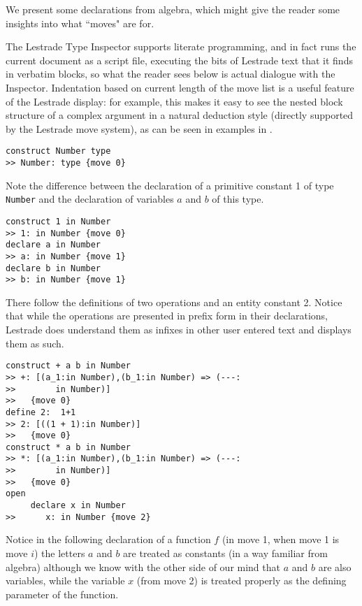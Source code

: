 \documentclass[submission,copyright,creativecommons]{eptcs}
\begin{document}
We present some declarations from algebra, which might give the reader some insights into what ``moves" are for.

The Lestrade Type Inspector supports literate programming, and in fact runs the current document as a script file, executing the bits of Lestrade text that it finds in verbatim blocks, so what the reader sees below is actual dialogue with the Inspector.  Indentation based on current length of the move list is a useful feature of the Lestrade display:  for example, this makes it easy to see the nested block structure of a complex argument in a natural deduction style (directly supported by the Lestrade move system), as can be seen in examples in \cite{lestrademanual}.

\begin{verbatim}
construct Number type
>> Number: type {move 0}
\end{verbatim}

Note the difference between the declaration of a primitive constant 1 of type {\tt Number} and the declaration of variables $a$ and $b$ of this type.

\begin{verbatim}
construct 1 in Number
>> 1: in Number {move 0}
declare a in Number
>> a: in Number {move 1}
declare b in Number
>> b: in Number {move 1}
\end{verbatim}

There follow the definitions of two operations and an entity constant 2.  Notice that while
the operations are presented in prefix form in their declarations, Lestrade does understand them
as infixes in other user entered text and displays them as such.

\begin{verbatim}
construct + a b in Number
>> +: [(a_1:in Number),(b_1:in Number) => (---:
>>        in Number)]
>>   {move 0}
define 2:  1+1
>> 2: [((1 + 1):in Number)]
>>   {move 0}
construct * a b in Number
>> *: [(a_1:in Number),(b_1:in Number) => (---:
>>        in Number)]
>>   {move 0}
open
     declare x in Number
>>      x: in Number {move 2}
\end{verbatim}

Notice in the following  declaration of a function $f$ (in move 1, when move 1 is move $i$) the letters $a$ and $b$ are treated as constants (in a way familiar from algebra) although we know with the other side of our mind that $a$ and $b$ are also variables, while the variable $x$ (from move 2) is treated properly as the defining parameter of the function.
\end{document}
